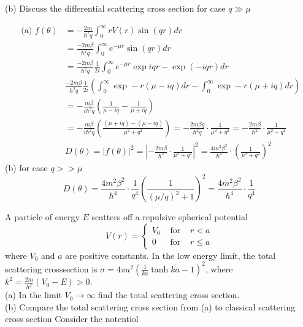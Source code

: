 \begin{enumerate}
\begin{minipage}{\textwidth}
	(b) Discuss the differential scattering cross section for case $q \gg \mu$
\end{minipage}
\begin{answer}
	\begin{align*}
		\text { (a) } f(\theta)&=-\frac{2 m}{\hbar^{2} q} \int_{0}^{\infty} r V(r) \sin (q r) d r\\
		&=\frac{-2 m \beta}{\hbar^{2} q} \int_{0}^{\infty} e^{-\mu r} \sin (q r) d r\\&=\frac{-2 m \beta}{\hbar^{2} q} \frac{1}{2 i} \int_{0}^{\infty} e^{-\mu r} \exp i q r-\exp (-i q r) d r \\
		&\frac{-2 m \beta}{\hbar^{2} q} \frac{1}{2 i}\left(\int_{0}^{\infty} \exp -r(\mu-i q) d r-\int_{0}^{\infty} \exp -r(\mu+i q) d r\right)\\
		&=-\frac{m \beta}{i \hbar^{2} q}\left(\frac{1}{\mu-i q}-\frac{1}{\mu+i q}\right) \\
		&=-\frac{m \beta}{i \hbar^{2} q}\left(\frac{(\mu+i q)-(\mu-i q)}{\mu^{2}+q^{2}}\right)=-\frac{2 m \beta q}{\hbar^{2} q} \cdot \frac{1}{\mu^{2}+q^{2}}=-\frac{2 m \beta}{\hbar^{2}} \cdot \frac{1}{\mu^{2}+q^{2}} \\
		&D(\theta)=|f(\theta)|^{2}=\left|-\frac{2 m \beta}{\hbar^{2}} \cdot \frac{1}{\mu^{2}+q^{2}}\right|^{2}=\frac{4 m^{2} \beta^{2}}{\hbar^{4}} \cdot\left(\frac{1}{\mu^{2}+q^{2}}\right)^{2}
	\end{align*}
	(b) for case $q>>\mu$
	$$
	D(\theta)=\frac{4 m^{2} \beta^{2}}{\hbar^{4}} \cdot \frac{1}{q^{4}}\left(\frac{1}{(\mu / q)^{2}+1}\right)^{2}=\frac{4 m^{2} \beta^{2}}{\hbar^{4}} \cdot \frac{1}{q^{4}}
	$$
\end{answer}
	\begin{minipage}{\textwidth}
	\item A particle of energy $E$ scatters off a repulsive spherical potential
	$$
	V(r)=\left\{\begin{array}{ccc}
	V_{0} & \text { for } & r<a \\
	0 & \text { for } & r \leq a
	\end{array}\right.
	$$
	where $V_{0}$ and $a$ are positive constants. In the low energy limit, the total scattering crosssection is $\sigma=4 \pi a^{2}\left(\frac{1}{k a} \tanh k a-1\right)^{2}$, where $k^{2}=\frac{2 m}{h^{2}}\left(V_{0}-E\right)>0 .$\\
	(a) In the limit $V_{0} \rightarrow \infty$ find the total scattering cross section.\\
	(b) Compare the total scattering cross section from (a) to classical scattering cross section Consider the notentiol

\end{minipage}
\end{enumerate}
